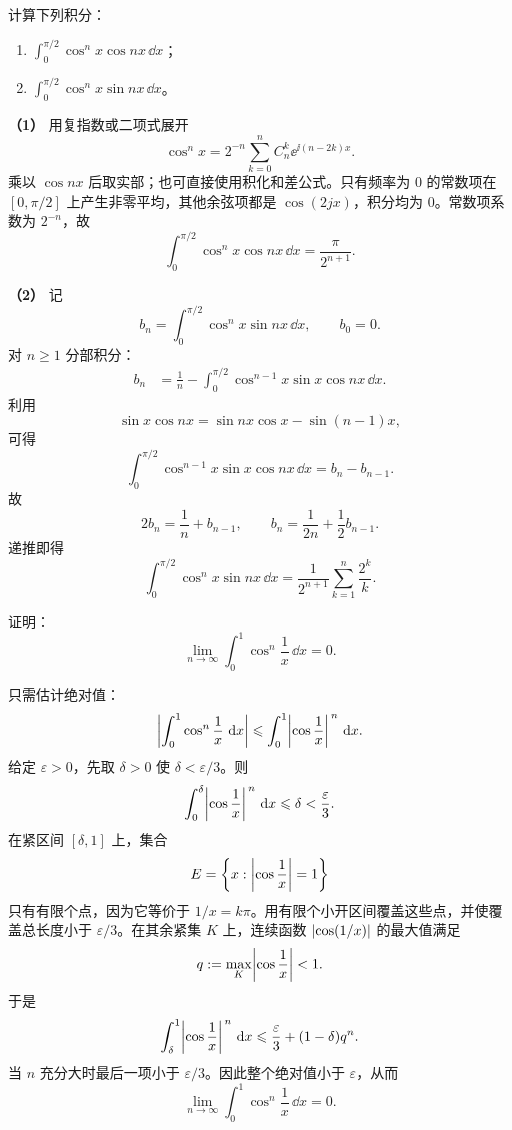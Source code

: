 \begin{xreferenceproblem}[6]
计算下列积分：
\begin{enumerate}[label=(\arabic*)]
  \item $\displaystyle\int_0^{\pi/2}\cos^n x\cos nx\,\dd x$；
  \item $\displaystyle\int_0^{\pi/2}\cos^n x\sin nx\,\dd x$。
\end{enumerate}
\end{xreferenceproblem}
\begin{xsolution}
\textbf{（1）}\quad
用复指数或二项式展开
\[
  \cos^n x=2^{-n}\sum_{k=0}^n C_n^k\ee^{\ii(n-2k)x}.
\]
乘以 $\cos nx$ 后取实部；也可直接使用积化和差公式。只有频率为 $0$ 的常数项在 $[0,\pi/2]$ 上产生非零平均，其他余弦项都是 $\cos(2jx)$，积分均为 $0$。常数项系数为 $2^{-n}$，故
\[
  \boxed{\int_0^{\pi/2}\cos^n x\cos nx\,\dd x
  =\frac{\pi}{2^{n+1}}}.
\]

\textbf{（2）}\quad
记
\[
  b_n=\int_0^{\pi/2}\cos^n x\sin nx\,\dd x,
  \qquad b_0=0.
\]
对 $n\geqslant1$ 分部积分：
\begin{align*}
  b_n
  &=\frac1n-\int_0^{\pi/2}\cos^{n-1}x\sin x\cos nx\,\dd x.
\end{align*}
利用
\[
  \sin x\cos nx=\sin nx\cos x-\sin(n-1)x,
\]
可得
\[
  \int_0^{\pi/2}\cos^{n-1}x\sin x\cos nx\,\dd x
  =b_n-b_{n-1}.
\]
故
\[
  2b_n=\frac1n+b_{n-1},
  \qquad
  b_n=\frac1{2n}+\frac12b_{n-1}.
\]
递推即得
\[
  \boxed{
  \int_0^{\pi/2}\cos^n x\sin nx\,\dd x
  =\frac1{2^{n+1}}\sum_{k=1}^n\frac{2^k}{k}}.
\]
\end{xsolution}


\begin{xreferenceproblem}[7]
证明：
\[
  \lim_{n\to\infty}\int_0^1\cos^n\frac1x\,\dd x=0.
\]
\end{xreferenceproblem}
\begin{xsolution}
只需估计绝对值：
\[
  \abs*{\int_0^1\cos^n\frac1x\,\dd x}
  \leqslant\int_0^1\abs*{\cos\frac1x}^{\,n}\,\dd x.
\]
给定 $\varepsilon>0$，先取 $\delta>0$ 使 $\delta<\varepsilon/3$。则
\[
  \int_0^\delta\abs*{\cos\frac1x}^{\,n}\,\dd x\leqslant\delta<\frac\varepsilon3.
\]
在紧区间 $[\delta,1]$ 上，集合
\[
  E=\left\{x:\abs*{\cos\frac1x}=1\right\}
\]
只有有限个点，因为它等价于 $1/x=k\pi$。用有限个小开区间覆盖这些点，并使覆盖总长度小于 $\varepsilon/3$。在其余紧集 $K$ 上，连续函数 $\abs{\cos(1/x)}$ 的最大值满足
\[
  q:=\max_K\abs*{\cos\frac1x}<1.
\]
于是
\[
  \int_\delta^1\abs*{\cos\frac1x}^{\,n}\,\dd x
  \leqslant\frac\varepsilon3+(1-\delta)q^n.
\]
当 $n$ 充分大时最后一项小于 $\varepsilon/3$。因此整个绝对值小于 $\varepsilon$，从而
\[
  \boxed{\lim_{n\to\infty}\int_0^1\cos^n\frac1x\,\dd x=0}.
\]
\end{xsolution}


